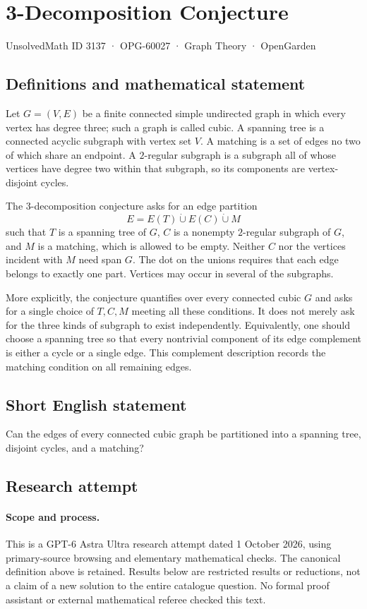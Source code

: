 \documentclass[11pt,a4paper]{article}
\begin{document}
\section*{3-Decomposition Conjecture}\label{3137}
{\small UnsolvedMath ID 3137 · OPG-60027 · Graph Theory · OpenGarden}
\subsection{Definitions and mathematical statement}
Let $G=(V,E)$ be a finite connected simple undirected graph in which
every vertex has degree three; such a graph is called cubic. A
spanning tree is a connected acyclic subgraph with vertex set $V$.
A matching is a set of edges no two of which share an endpoint. A
$2$-regular subgraph is a subgraph all of whose vertices have degree
two within that subgraph, so its components are vertex-disjoint
cycles.

The $3$-decomposition conjecture asks for an edge partition
\[
 E=E(T)\mathbin{\dot\cup}E(C)\mathbin{\dot\cup}M
\]
such that $T$ is a spanning tree of $G$, $C$ is a nonempty
$2$-regular subgraph of $G$, and $M$ is a matching, which is allowed
to be empty. Neither $C$ nor the vertices incident with $M$ need
span $G$. The dot on the unions requires that each edge belongs to
exactly one part. Vertices may occur in several of the subgraphs.

More explicitly, the conjecture quantifies over every connected
cubic $G$ and asks for a single choice of $T,C,M$ meeting all these
conditions. It does not merely ask for the three kinds of subgraph
to exist independently. Equivalently, one should choose a spanning
tree so that every nontrivial component of its edge complement is
either a cycle or a single edge. This complement description records
the matching condition on all remaining edges.
\subsection{Short English statement}
Can the edges of every connected cubic graph be partitioned into a spanning tree, disjoint cycles, and a matching?
\subsection{Research attempt}
\paragraph{Scope and process.}
This is a GPT-6 Astra Ultra research attempt dated 1 October 2026, using
primary-source browsing and elementary mathematical checks. The canonical
definition above is retained. Results below are restricted results or
reductions, not a claim of a new solution to the entire catalogue question.
No formal proof assistant or external mathematical referee checked this text.
\end{document}
